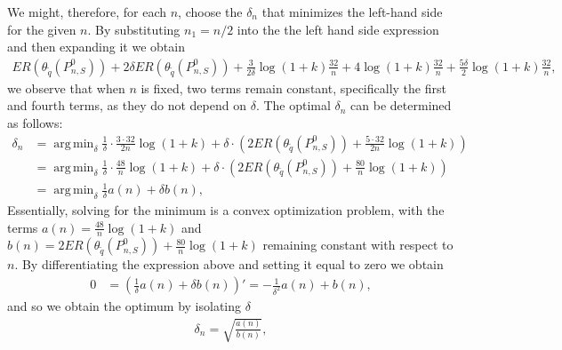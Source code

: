 \documentclass[11pt, a4paper]{article}
\DeclareMathOperator*{\argmin}{arg\,min}
\theoremstyle{definition}
\theoremstyle{remark}
\newcommand{\cl}{q}
\begin{document}
We might, therefore, for each $ n $, choose the $ \delta_n $ that minimizes the left-hand side for the given $ n $. By substituting $ n_1 = n/2 $ into the the left hand side expression and then expanding it we obtain 
\begin{align*}
 ER(\theta_{ \tilde{\cl}}(P_{n,S}^{0})) + 2 \delta ER(\theta_{ \tilde{\cl}}(P_{n,S}^{0})) +\frac{3}{2\delta}\log (1 +k) \frac{32}{n} + 4\log (1 +k) \frac{32}{n} + \frac{5\delta}{2} \log (1 +k)   \frac{32}{n},
\end{align*}
we observe that when $n$ is fixed, two terms remain constant, specifically the first and fourth terms, as they do not depend on $\delta$. The optimal $\delta_n$ can be determined as follows:
\begin{align*}
    \delta_n &= \argmin_{\delta} \frac{1}{\delta} \cdot \frac{3 \cdot 32}{2n} \log(1 + k) + \delta \cdot \left(2ER(\theta_{ \tilde{\cl} }(P_{n, S}^{0})) + \frac{5 \cdot 32}{2n} \log(1 + k) \right) \\
    &= \argmin_{\delta} \frac{1}{\delta} \cdot \frac{48}{n} \log(1 + k) + \delta \cdot \left(2ER(\theta_{ \tilde{\cl} }(P_{n, S}^{0})) + \frac{80}{n} \log(1 + k) \right) \\
    &= \argmin_{\delta} \frac{1}{\delta} a(n) + \delta b(n),
\end{align*}
Essentially, solving for the minimum is a convex optimization problem, with the terms $a(n) = \frac{48}{n} \log(1 + k)$ and $b(n) = 2ER(\theta_{ \tilde{\cl} }(P_{n, S}^{0})) + \frac{80}{n} \log(1 + k)$ remaining constant with respect to $n$. By differentiating the expression above and setting it equal to zero we obtain 
\begin{align*}
    0 &= \left( \frac{1}{\delta} a(n) + \delta b(n) \right)' = - \frac{1}{\delta^2} a(n) + b(n),
\end{align*}
and so we obtain the optimum by isolating $ \delta $ 
\begin{align*}
    \delta_n = \sqrt{\frac{a(n)}{b(n)}},
\end{align*}
\end{document}
